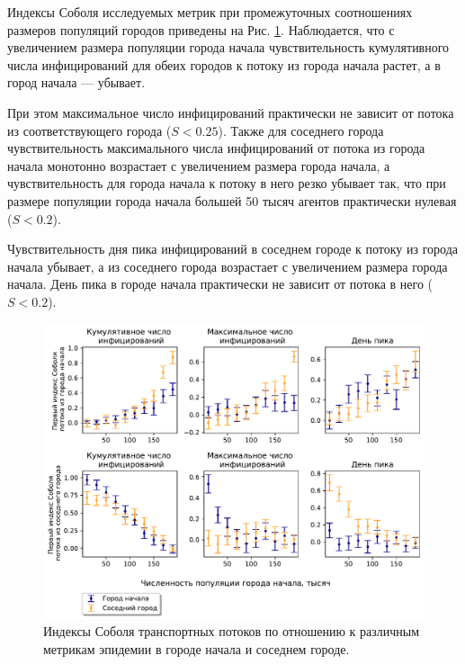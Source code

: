 \documentclass[a4paper,12pt]{article} %
\begin{document}
Индексы Соболя исследуемых метрик при промежуточных соотношениях размеров популяций городов приведены на Рис. \ref{pic:bignsmall_bars}. Наблюдается, что с увеличением размера популяции города начала чувствительность кумулятивного числа инфицирований для обеих городов к потоку из города начала растет, а в город начала --- убывает. 

При этом максимальное число инфицирований практически не зависит от потока из соответствующего города ($S < 0.25$). Также для соседнего города чувствительность максимального числа инфицирований от потока из города начала монотонно возрастает с увеличением размера города начала, а чувствительность для города начала к потоку в него резко убывает так, что при размере популяции города начала большей 50 тысяч агентов практически нулевая ($S < 0.2$). 

Чувствительность дня пика инфицирований в соседнем городе к потоку из города начала убывает, а из соседнего города возрастает с увеличением размера города начала. День пика в городе начала практически не зависит от потока в него ($S < 0.2$).

\begin{figure}[H]
    \centering
    \includegraphics[width=\linewidth]{images/bignsmall_bars.pdf}
    \caption{Индексы Соболя транспортных потоков по отношению к различным метрикам эпидемии в городе начала и соседнем городе.}
    \label{pic:bignsmall_bars}
\end{figure}
\end{document}
